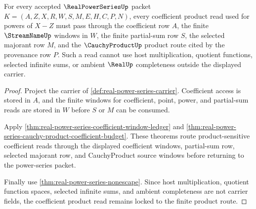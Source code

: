 \begin{theorem}
\label{thm:real-power-series-product-coefficient-window-lock}
For every accepted $\RealPowerSeriesUp$ packet $K=(A,Z,X,R,W,S,M,E,H,C,P,N)$, every coefficient product read used for powers of $X-Z$ must pass through the coefficient row $A$, the finite $\StreamNameUp$ windows in $W$, the finite partial-sum row $S$, the selected majorant row $M$, and the $\CauchyProductUp$ product route cited by the provenance row $P$. Such a read cannot use host multiplication, quotient functions, selected infinite sums, or ambient $\RealUp$ completeness outside the displayed carrier.
\end{theorem}
\begin{proof}
Project the carrier of \autoref{def:real-power-series-carrier}. Coefficient access is stored in $A$, and the finite windows for coefficient, point, power, and partial-sum reads are stored in $W$ before $S$ or $M$ can be consumed.

Apply \autoref{thm:real-power-series-coefficient-window-ledger} and \autoref{thm:real-power-series-cauchy-product-coefficient-budget}. These theorems route product-sensitive coefficient reads through the displayed coefficient windows, partial-sum row, selected majorant row, and CauchyProduct source windows before returning to the power-series packet.

Finally use \autoref{thm:real-power-series-nonescape}. Since host multiplication, quotient function spaces, selected infinite sums, and ambient completeness are not carrier fields, the coefficient product read remains locked to the finite product route.
\end{proof}

